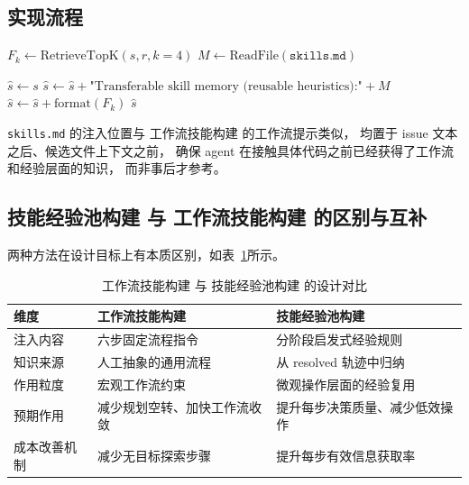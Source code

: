 \subsection{实现流程}

\begin{algorithm}[H]
\caption{方法六：技能经验池构建（skill\_memory\_md）}
\label{alg:skill-memory}

\BlankLine
$F_k \leftarrow \text{RetrieveTopK}(s, r, k=4)$ 
$M \leftarrow \text{ReadFile}(\texttt{skills.md})$ 

\BlankLine
$\hat{s} \leftarrow s$\;
$\hat{s} \leftarrow \hat{s} + \text{"Transferable skill memory (reusable heuristics):"} + M$\;
$\hat{s} \leftarrow \hat{s} + \text{format}(F_k)$\;
\Return $\hat{s}$\;
\end{algorithm}

\texttt{skills.md} 的注入位置与 工作流技能构建 的工作流提示类似，
均置于 issue 文本之后、候选文件上下文之前，
确保 agent 在接触具体代码之前已经获得了工作流和经验层面的知识，
而非事后才参考。

\subsection{技能经验池构建 与 工作流技能构建 的区别与互补}

两种方法在设计目标上有本质区别，如表~\ref{tab:skill-compare}所示。

\begin{table}[htbp]
\centering
\caption{工作流技能构建 与 技能经验池构建 的设计对比}
\label{tab:skill-compare}

\setlength{\tabcolsep}{4pt}

\begin{tabularx}{\textwidth}{lXX}
\toprule
维度 & 工作流技能构建 & 技能经验池构建 \\
\midrule
注入内容 & 六步固定流程指令 & 分阶段启发式经验规则 \\
知识来源 & 人工抽象的通用流程 & 从 resolved 轨迹中归纳 \\
作用粒度 & 宏观工作流约束 & 微观操作层面的经验复用 \\
预期作用 & 减少规划空转、加快工作流收敛 & 提升每步决策质量、减少低效操作 \\
成本改善机制 & 减少无目标探索步骤 & 提升每步有效信息获取率 \\
\bottomrule
\end{tabularx}

\end{table}


